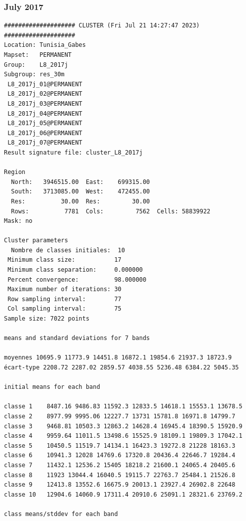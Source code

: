 \documentclass[land,article,submit,pdftex,moreauthors]{Definitions/mdpi}
\begin{document}
\subsubsection[\appendixname~\thesubsubsection]{July 2017}
\begin{scriptsize}
\begin{verbatim}
#################### CLUSTER (Fri Jul 21 14:27:47 2023) ####################
Location: Tunisia_Gabes
Mapset:   PERMANENT
Group:    L8_2017j
Subgroup: res_30m
 L8_2017j_01@PERMANENT
 L8_2017j_02@PERMANENT
 L8_2017j_03@PERMANENT
 L8_2017j_04@PERMANENT
 L8_2017j_05@PERMANENT
 L8_2017j_06@PERMANENT
 L8_2017j_07@PERMANENT
Result signature file: cluster_L8_2017j

Region
  North:   3946515.00  East:    699315.00
  South:   3713085.00  West:    472455.00
  Res:          30.00  Res:         30.00
  Rows:          7781  Cols:         7562  Cells: 58839922
Mask: no

Cluster parameters
  Nombre de classes initiales: 	10
 Minimum class size:           17
 Minimum class separation:     0.000000
 Percent convergence:          98.000000
 Maximum number of iterations: 30
 Row sampling interval:        77
 Col sampling interval:        75
Sample size: 7022 points

means and standard deviations for 7 bands

moyennes 10695.9 11773.9 14451.8 16872.1 19854.6 21937.3 18723.9
écart-type 2208.72 2287.02 2859.57 4038.55 5236.48 6384.22 5045.35

initial means for each band

classe 1    8487.16 9486.83 11592.3 12833.5 14618.1 15553.1 13678.5
classe 2    8977.99 9995.06 12227.7 13731 15781.8 16971.8 14799.7
classe 3    9468.81 10503.3 12863.2 14628.4 16945.4 18390.5 15920.9
classe 4    9959.64 11011.5 13498.6 15525.9 18109.1 19809.3 17042.1
classe 5    10450.5 11519.7 14134.1 16423.3 19272.8 21228 18163.3
classe 6    10941.3 12028 14769.6 17320.8 20436.4 22646.7 19284.4
classe 7    11432.1 12536.2 15405 18218.2 21600.1 24065.4 20405.6
classe 8    11923 13044.4 16040.5 19115.7 22763.7 25484.1 21526.8
classe 9    12413.8 13552.6 16675.9 20013.1 23927.4 26902.8 22648
classe 10   12904.6 14060.9 17311.4 20910.6 25091.1 28321.6 23769.2

class means/stddev for each band


\end{verbatim}
\end{scriptsize}
\end{document}
